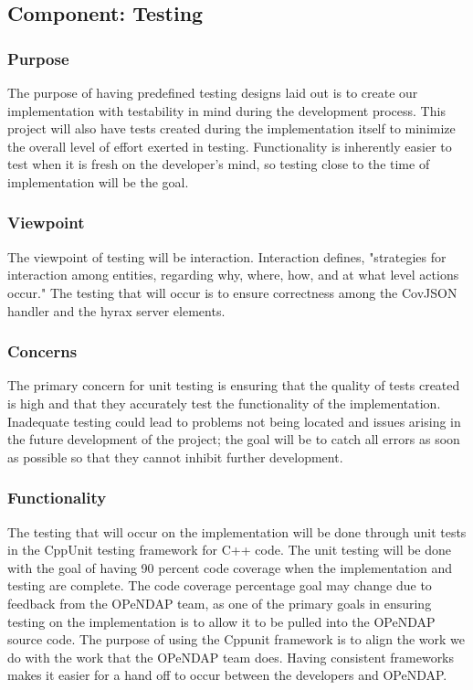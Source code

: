 \documentclass[onecolumn, draftclsnofoot,10pt, compsoc]{IEEEtran}
\begin{document}
\subsection{Component: Testing}
\subsubsection{Purpose}
The purpose of having predefined testing designs laid out is to create our implementation with testability in mind during the development process. This project will also have tests created during the implementation itself to minimize the overall level of effort exerted in testing. Functionality is inherently easier to test when it is fresh on the developer’s mind, so testing close to the time of implementation will be the goal.

\subsubsection{Viewpoint}
The viewpoint of testing will be interaction. Interaction defines, "strategies for interaction among entities, regarding why, where, how, and at what level actions occur." \cite{IEEE} The testing that will occur is to ensure correctness among the CovJSON handler and the hyrax server elements.

\subsubsection{Concerns}
The primary concern for unit testing is ensuring that the quality of tests created is high and that they accurately test the functionality of the implementation. Inadequate testing could lead to problems not being located and issues arising in the future development of the project; the goal will be to catch all errors as soon as possible so that they cannot inhibit further development.

\subsubsection{Functionality}
The testing that will occur on the implementation will be done through unit tests in the \gls{CppUnit} testing framework for C++ code. The unit testing will be done with the goal of having 90 percent code coverage when the implementation and testing are complete. The code coverage percentage goal may change due to feedback from the OPeNDAP team, as one of the primary goals in ensuring testing on the implementation is to allow it to be pulled into the OPeNDAP source code. The purpose of using the Cppunit framework is to align the work we do with the work that the OPeNDAP team does. Having consistent frameworks makes it easier for a hand off to occur between the developers and OPeNDAP.
\end{document}
